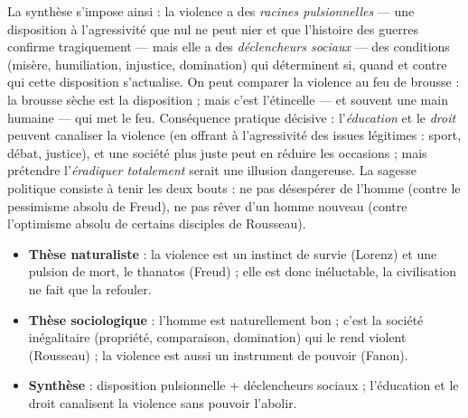 \documentclass[11pt]{article}
\newcommand{\cle}[1]{{\popxbold\color{popdark}#1}}
\begin{document}
La synthèse s'impose ainsi : la violence a des \emph{racines pulsionnelles} — une \cle{disposition} à l'agressivité que nul ne peut nier et que l'histoire des guerres confirme tragiquement — mais elle a des \emph{déclencheurs sociaux} — des \cle{conditions} (misère, humiliation, injustice, domination) qui déterminent si, quand et contre qui cette disposition s'actualise. On peut comparer la violence au feu de brousse : la brousse sèche est la disposition ; mais c'est l'étincelle — et souvent une main humaine — qui met le feu. Conséquence pratique décisive : l'\emph{éducation} et le \emph{droit} peuvent canaliser la violence (en offrant à l'agressivité des issues légitimes : sport, débat, justice), et une société plus juste peut en réduire les occasions ; mais prétendre l'\emph{éradiquer totalement} serait une illusion dangereuse. La sagesse politique consiste à tenir les deux bouts : ne pas désespérer de l'homme (contre le pessimisme absolu de Freud), ne pas rêver d'un homme nouveau (contre l'optimisme absolu de certains disciples de Rousseau).

\begin{aretenir}
\begin{itemize}
\item \textbf{Thèse naturaliste} : la violence est un instinct de survie (Lorenz) et une pulsion de mort, le \cle{thanatos} (Freud) ; elle est donc inéluctable, la civilisation ne fait que la refouler.
\item \textbf{Thèse sociologique} : l'homme est naturellement bon ; c'est la société inégalitaire (propriété, comparaison, domination) qui le rend violent (Rousseau) ; la violence est aussi un instrument de pouvoir (Fanon).
\item \textbf{Synthèse} : disposition pulsionnelle + déclencheurs sociaux ; l'éducation et le droit canalisent la violence sans pouvoir l'abolir.
\end{itemize}
\end{aretenir}
\end{document}
